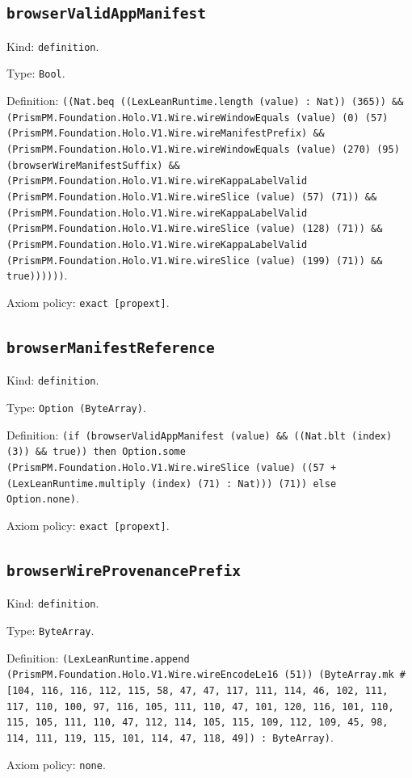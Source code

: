 \documentclass[11pt]{article}
\begin{document}
\subsection*{\texttt{browserValidAppManifest}}
\noindent Kind: \texttt{definition}.\par
\noindent Type: \texttt{Bool}.\par
\noindent Definition: \texttt{((Nat.beq ((LexLeanRuntime.length (value) : Nat)) (365)) \&\& (PrismPM.Foundation.Holo.V1.Wire.wireWindowEquals (value) (0) (57) (PrismPM.Foundation.Holo.V1.Wire.wireManifestPrefix) \&\& (PrismPM.Foundation.Holo.V1.Wire.wireWindowEquals (value) (270) (95) (browserWireManifestSuffix) \&\& (PrismPM.Foundation.Holo.V1.Wire.wireKappaLabelValid (PrismPM.Foundation.Holo.V1.Wire.wireSlice (value) (57) (71)) \&\& (PrismPM.Foundation.Holo.V1.Wire.wireKappaLabelValid (PrismPM.Foundation.Holo.V1.Wire.wireSlice (value) (128) (71)) \&\& (PrismPM.Foundation.Holo.V1.Wire.wireKappaLabelValid (PrismPM.Foundation.Holo.V1.Wire.wireSlice (value) (199) (71)) \&\& true))))))}.\par
\noindent Axiom policy: \texttt{exact [propext]}.\par
\subsection*{\texttt{browserManifestReference}}
\noindent Kind: \texttt{definition}.\par
\noindent Type: \texttt{Option (ByteArray)}.\par
\noindent Definition: \texttt{(if (browserValidAppManifest (value) \&\& ((Nat.blt (index) (3)) \&\& true)) then Option.some (PrismPM.Foundation.Holo.V1.Wire.wireSlice (value) ((57 + (LexLeanRuntime.multiply (index) (71) : Nat))) (71)) else Option.none)}.\par
\noindent Axiom policy: \texttt{exact [propext]}.\par
\subsection*{\texttt{browserWireProvenancePrefix}}
\noindent Kind: \texttt{definition}.\par
\noindent Type: \texttt{ByteArray}.\par
\noindent Definition: \texttt{(LexLeanRuntime.append (PrismPM.Foundation.Holo.V1.Wire.wireEncodeLe16 (51)) (ByteArray.mk \#[104, 116, 116, 112, 115, 58, 47, 47, 117, 111, 114, 46, 102, 111, 117, 110, 100, 97, 116, 105, 111, 110, 47, 101, 120, 116, 101, 110, 115, 105, 111, 110, 47, 112, 114, 105, 115, 109, 112, 109, 45, 98, 114, 111, 119, 115, 101, 114, 47, 118, 49]) : ByteArray)}.\par
\noindent Axiom policy: \texttt{none}.\par
\end{document}
